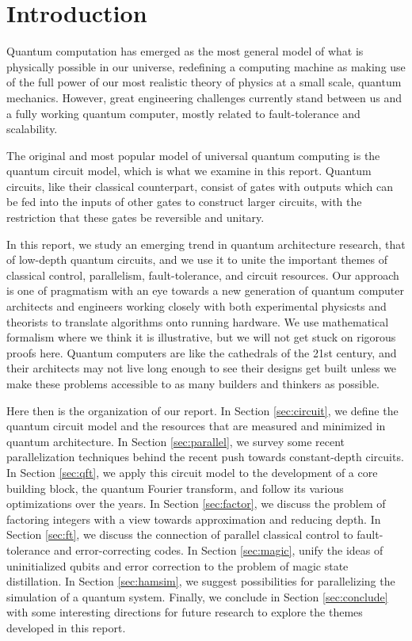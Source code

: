 \section{Introduction}
\label{sec:intro}

Quantum computation has emerged as the most general model of what is
physically possible in our universe, redefining a computing machine as
making use of the full power of our most realistic theory of physics
at a small scale, quantum mechanics. However, great engineering challenges
currently stand between us and a fully working quantum computer, mostly
related to fault-tolerance and scalability.

The original and most popular model of universal quantum computing is the
quantum circuit model, which is what we examine in this report.
Quantum circuits, like their classical counterpart, consist of gates
with outputs which can be fed into the inputs of other gates
to construct larger circuits, with the restriction that these gates be
reversible and unitary.

In this report, we study an emerging trend in quantum architecture
research, that of low-depth quantum circuits, and we use it to unite
the important themes of classical control, parallelism, fault-tolerance,
and circuit resources. Our approach is one of pragmatism with an
eye towards a new generation of quantum computer architects and engineers
working closely with both experimental physicsts and theorists to translate
algorithms onto running hardware. We use mathematical formalism where we
think it is illustrative, but we will not get stuck on rigorous proofs here.
Quantum computers are like the cathedrals of the 21st century, and their
architects may not live long enough to see their designs get built unless
we make these problems accessible to as many builders and thinkers as possible.

Here then is the organization of our report.
In Section \ref{sec:circuit}, we define the quantum circuit model and the
resources that are measured and minimized in quantum architecture.
In Section \ref{sec:parallel}, we survey some recent
parallelization techniques
behind the recent push towards constant-depth circuits.
In Section \ref{sec:qft}, we apply this circuit model to the development of
a core building block, the quantum Fourier transform, and follow its
various optimizations over the years. In Section \ref{sec:factor}, we
discuss the problem of factoring integers with a view towards approximation
and reducing depth.
In Section \ref{sec:ft}, we discuss the connection of parallel classical
control to fault-tolerance and error-correcting codes.
In Section \ref{sec:magic}, unify the ideas of uninitialized qubits and
error correction to the problem of
magic state distillation. In Section \ref{sec:hamsim}, we suggest
possibilities for parallelizing
the simulation of a quantum system.
Finally, we conclude in Section \ref{sec:conclude} with
some interesting directions for future research to explore the themes developed
in this report.
